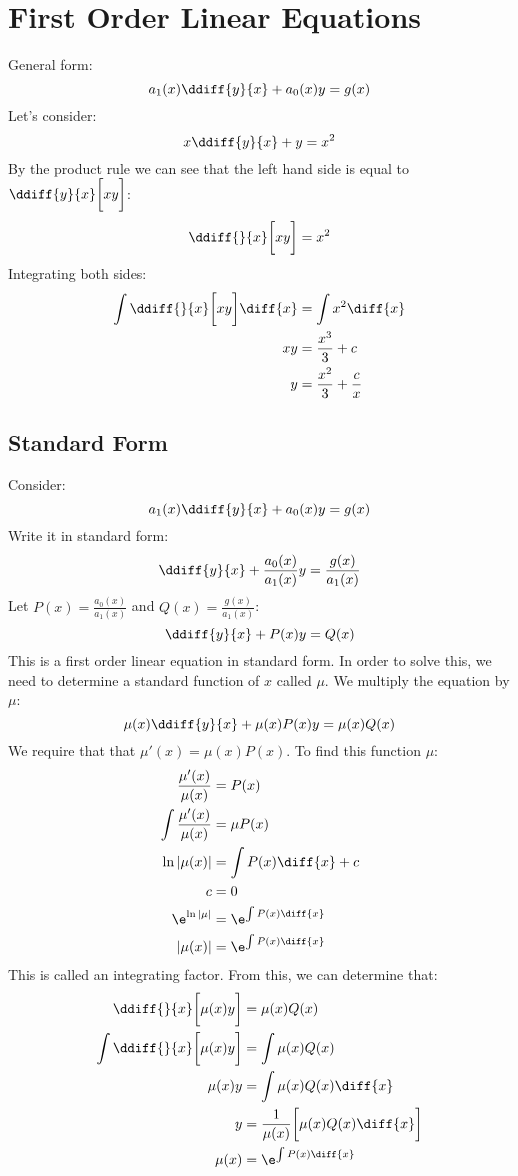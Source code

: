 \documentclass{math}
\begin{document}
\clearpage
\section*{First Order Linear Equations}
General form:
\[ a_1(x)\ddiff{y}{x}+a_0(x)y = g(x) \]
Let's consider:
\[ x\ddiff{y}{x}+y = x^2 \]
By the product rule we can see that the left hand side is equal to
\( \ddiff{y}{x}\bigg[xy\bigg] \):
\[ \ddiff{}{x}\bigg[xy\bigg] = x^2 \]
Integrating both sides:
\begin{align*}
  \int\ddiff{}{x}\bigg[xy\bigg]\diff{x} &= \int x^2\diff{x} \\
  xy &= \frac{x^3}{3}+c \\
  y &= \frac{x^2}{3}+\frac{c}{x}
\end{align*}

\subsection*{Standard Form}
Consider:
\[ a_1(x)\ddiff{y}{x}+a_0(x)y = g(x) \]
Write it in standard form:
\[ \ddiff{y}{x}+\frac{a_0(x)}{a_1(x)}y = \frac{g(x)}{a_1(x)} \]
Let \( P(x) = \frac{a_0(x)}{a_1(x)} \) and \( Q(x) = \frac{g(x)}{a_1(x)} \):
\[ \ddiff{y}{x}+P(x)y = Q(x) \]
This is a first order linear equation in standard form. In order to solve this,
we need to determine a standard function of \( x \) called \( \mu \). We
multiply the equation by \( \mu \):
\[ \mu(x)\ddiff{y}{x}+\mu(x)P(x)y = \mu(x)Q(x) \]
We require that that \( \mu'(x) = \mu(x)P(x) \). To find this function
\( \mu \):
\begin{align*}
  \frac{\mu'(x)}{\mu(x)} &= P(x) \\
  \int \frac{\mu'(x)}{\mu(x)} &= \mu P(x) \\
  \ln|\mu(x)| &= \int P(x)\diff{x}+c \\
  c &= 0 \\
  \e^{\ln|\mu|} &= \e^{\int P(x)\diff{x}} \\
  |\mu(x)| &= \e^{\int P(x)\diff{x}}
\end{align*}
This is called an integrating factor. From this, we can determine that:
\begin{align*}
  \ddiff{}{x}\bigg[\mu(x)y\bigg] &= \mu(x)Q(x) \\
  \int\ddiff{}{x}\bigg[\mu(x)y\bigg] &= \int\mu(x)Q(x) \\
  \mu(x)y &= \int\mu(x)Q(x)\diff{x} \\
  y &= \frac{1}{\mu(x)}\bigg[\mu(x)Q(x)\diff{x}\bigg] \\
  \mu(x) &= \e^{\int P(x)\diff{x}}
\end{align*}
\end{document}
